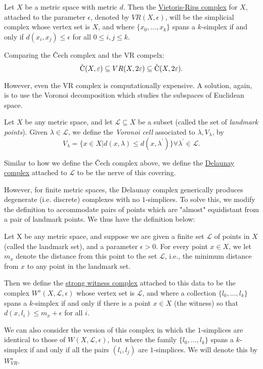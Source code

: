\begin{defn}
	Let $X$ be a metric space with metric $d$. Then the  \underline{Vietoris-Rips complex} for $X$, attached to the parameter $\epsilon$, denoted by $VR(X,\epsilon)$, will be the simplicial complex whose vertex set is $X$, and where $\{x_0,\dots, x_k\}$ spans a $k$-simplex if and only if $d(x_i,x_j) \leq \epsilon$ for all $0\leq i,j\leq k.$
\end{defn}

\begin{prop}
	Comparing the \v{C}ech complex and the VR compelx:
	$$ \operatorname{\check{C}}(X,\varepsilon) \subseteq VR (X,2\varepsilon) \subseteq \operatorname{\check{C}}(X,2\varepsilon).$$
\end{prop}

However, even the VR complex is computationally expensive. A solution, again, is to use the Voronoi decomposition which studies the subspaces of Euclidean space. 

\begin{thm}
	Let $X$ be any metric space, and let $\mathcal{L}\subseteq X$ be a subset (called the set of \textit{landmark points}). Given $\lambda \in \mathcal{L}$, we define the \textit{Voronoi cell} associated to $\lambda, V_\lambda$, by
	$$V_\lambda = \{x\in X| d(x,\lambda) \leq d(x,\lambda^\prime)\} \forall \lambda^\prime \in \mathcal{L}.$$
\end{thm}


\begin{defn}
	Similar to how we define the \v{C}ech complex above, we define the \underline{Delaunay complex} attached to $\mathcal{L}$ to be the nerve of this covering.
\end{defn}

However, for finite metric spaces, the Delaunay complex generically produces degenerate (i.e. discrete) complexes with no $1$-simplices. To solve this, we modify the definition to accommodate pairs of points which are "almost" equidistant from a pair of landmark points. We thus have the definition below: 

\begin{defn}
	Let X be any metric space, and suppose we are given a finite set $\mathcal{L}$ of points in $X$ (called the landmark set), and a parameter $\epsilon> 0$. For every point $x \in X$, we let $m_x$ denote the distance from this point to the set $\mathcal{L}$, i.e., the minimum distance from $x$ to any point in the landmark set.
	
	Then we define the \underline{strong witness complex} attached to this data to be the complex $W^s(X,\mathcal{L}, \epsilon)$ whose vertex set is $\mathcal{L}$, and where a collection $\{l_0, \dots, l_k\}$ spans a $k$-simplex if and only if there is a point $x \in X$ (the witness) so that $d(x, l_i)\leq m_x + \epsilon$ for all $i$. 
	
	We can also consider the version of this complex in which the $1$-simplices are identical to those of $W(X,\mathcal{L},\epsilon)$, but where the family $\{l_0, \dots, l_k\}$ spans a $k$-simplex if and only if all the pairs $(l_i, l_j)$ are $1$-simplices. We will denote this by $W^s_{VR}$.
\end{defn}

